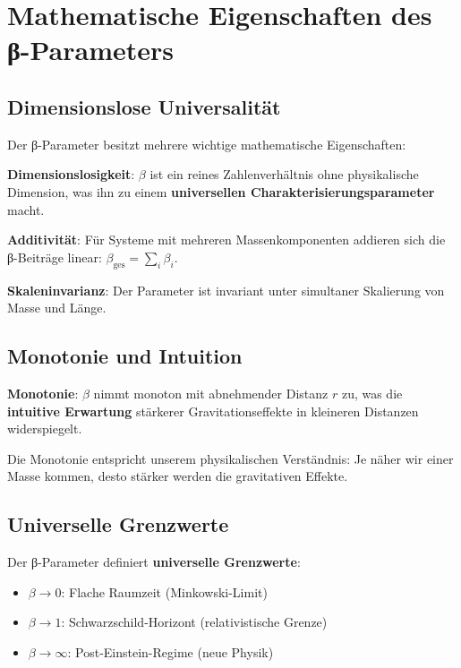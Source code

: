 \documentclass[12pt,a4paper]{report}
\begin{document}
	\section{Mathematische Eigenschaften des β-Parameters}
	
	\subsection{Dimensionslose Universalität}
	
	Der β-Parameter besitzt mehrere wichtige mathematische Eigenschaften:
	
	\textbf{Dimensionslosigkeit}: $\beta$ ist ein reines Zahlenverhältnis ohne physikalische Dimension, was ihn zu einem \textbf{universellen Charakterisierungsparameter} macht.
	
	\textbf{Additivität}: Für Systeme mit mehreren Massenkomponenten addieren sich die β-Beiträge linear: $\beta_{\text{ges}} = \sum_i \beta_i$.
	
	\textbf{Skaleninvarianz}: Der Parameter ist invariant unter simultaner Skalierung von Masse und Länge.
	
	\subsection{Monotonie und Intuition}
	
	\textbf{Monotonie}: $\beta$ nimmt monoton mit abnehmender Distanz $r$ zu, was die \textbf{intuitive Erwartung} stärkerer Gravitationseffekte in kleineren Distanzen widerspiegelt.
	
	Die Monotonie entspricht unserem physikalischen Verständnis: Je näher wir einer Masse kommen, desto stärker werden die gravitativen Effekte.
	
	\subsection{Universelle Grenzwerte}
	
	Der β-Parameter definiert \textbf{universelle Grenzwerte}:
	
	\begin{itemize}
		\item $\beta \to 0$: Flache Raumzeit (Minkowski-Limit)
		\item $\beta \to 1$: Schwarzschild-Horizont (relativistische Grenze)
		\item $\beta \to \infty$: Post-Einstein-Regime (neue Physik)
	\end{itemize}
	
\end{document}
